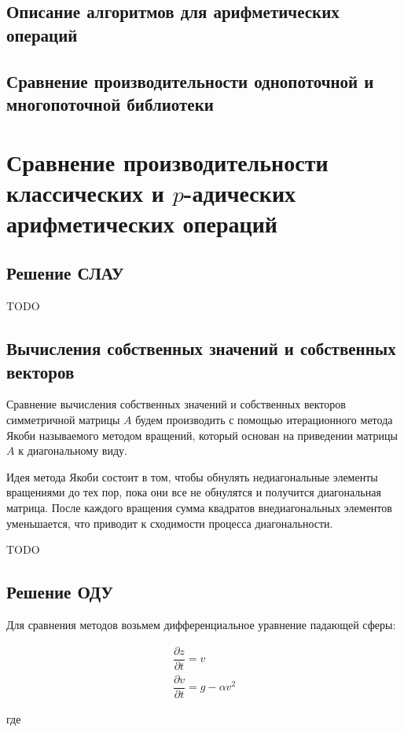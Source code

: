 \documentclass[master, och, diploma, times]{sty/SCWorks}
\theoremstyle{plain}
\theoremstyle{definition}
\begin{document}
\subsection{Описание алгоритмов для арифметических операций}
\subsection{Сравнение производительности однопоточной и многопоточной библиотеки} 


\section{Сравнение производительности классических и $p$-адических арифметических операций}
\subsection{Решение СЛАУ}
TODO

\subsection{Вычисления собственных значений и собственных векторов}
Сравнение вычисления собственных значений и собственных векторов симметричной матрицы $A$ будем производить с помощью итерационного метода Якоби называемого методом вращений, который основан на приведении матрицы $A$ к диагональному виду.

Идея метода Якоби состоит в том, чтобы обнулять недиагональные элементы вращениями до тех пор, пока они все не обнулятся и получится диагональная матрица. После каждого вращения сумма квадратов внедиагональных элементов уменьшается, что приводит к сходимости процесса диагональности. 

TODO

\subsection{Решение ОДУ}
Для сравнения методов возьмем дифференциальное уравнение падающей сферы:

\begin{equation}
\begin{aligned}
\dfrac{\partial z}{ \partial t} = v \\
\dfrac{\partial v}{ \partial t} = g - \alpha v^2
\end{aligned}
\end{equation}

\noindent где
\end{document}
